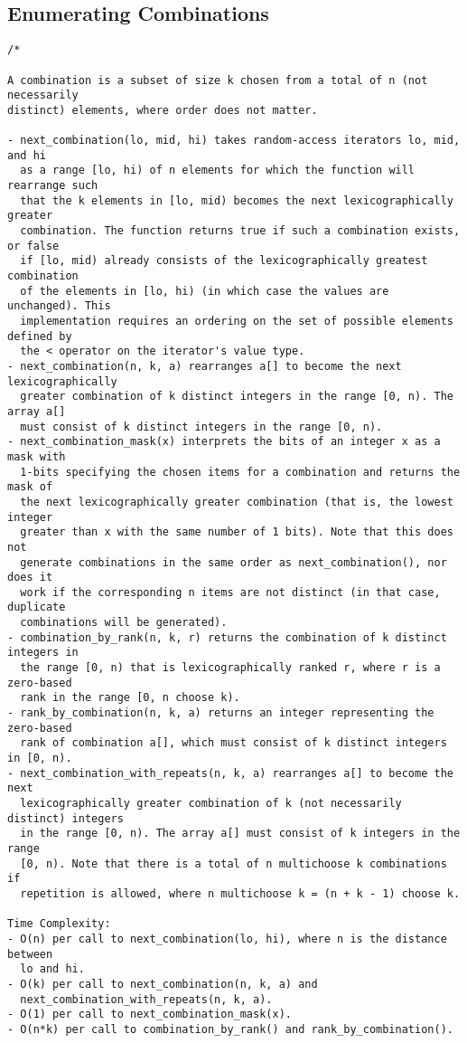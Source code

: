 \subsection{Enumerating Combinations}
\begin{lstlisting}
/*

A combination is a subset of size k chosen from a total of n (not necessarily
distinct) elements, where order does not matter.

- next_combination(lo, mid, hi) takes random-access iterators lo, mid, and hi
  as a range [lo, hi) of n elements for which the function will rearrange such
  that the k elements in [lo, mid) becomes the next lexicographically greater
  combination. The function returns true if such a combination exists, or false
  if [lo, mid) already consists of the lexicographically greatest combination
  of the elements in [lo, hi) (in which case the values are unchanged). This
  implementation requires an ordering on the set of possible elements defined by
  the < operator on the iterator's value type.
- next_combination(n, k, a) rearranges a[] to become the next lexicographically
  greater combination of k distinct integers in the range [0, n). The array a[]
  must consist of k distinct integers in the range [0, n).
- next_combination_mask(x) interprets the bits of an integer x as a mask with
  1-bits specifying the chosen items for a combination and returns the mask of
  the next lexicographically greater combination (that is, the lowest integer
  greater than x with the same number of 1 bits). Note that this does not
  generate combinations in the same order as next_combination(), nor does it
  work if the corresponding n items are not distinct (in that case, duplicate
  combinations will be generated).
- combination_by_rank(n, k, r) returns the combination of k distinct integers in
  the range [0, n) that is lexicographically ranked r, where r is a zero-based
  rank in the range [0, n choose k).
- rank_by_combination(n, k, a) returns an integer representing the zero-based
  rank of combination a[], which must consist of k distinct integers in [0, n).
- next_combination_with_repeats(n, k, a) rearranges a[] to become the next
  lexicographically greater combination of k (not necessarily distinct) integers
  in the range [0, n). The array a[] must consist of k integers in the range
  [0, n). Note that there is a total of n multichoose k combinations if
  repetition is allowed, where n multichoose k = (n + k - 1) choose k.

Time Complexity:
- O(n) per call to next_combination(lo, hi), where n is the distance between
  lo and hi.
- O(k) per call to next_combination(n, k, a) and
  next_combination_with_repeats(n, k, a).
- O(1) per call to next_combination_mask(x).
- O(n*k) per call to combination_by_rank() and rank_by_combination().


\end{lstlisting}
